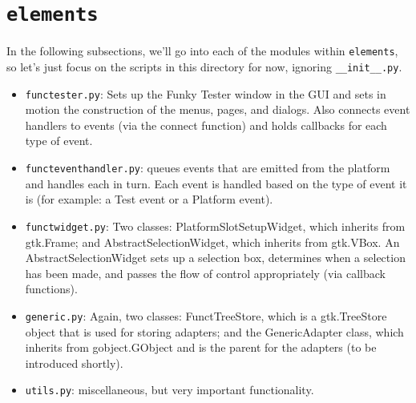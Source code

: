 \documentclass{report}
\begin{document}
\section{\texttt{elements}}
In the following subsections, we'll go into each of the modules within \texttt{elements}, so let's just focus on the scripts in this directory for now, ignoring \texttt{\_\_init\_\_.py}.\\

	\begin{minipage}{\linewidth}
		\label{fig:ui/elements}
	\end{minipage}
		\vspace{5pt}%
		
\begin{itemize}
	\item \texttt{functester.py}: Sets up the Funky Tester window in the GUI and sets in motion the construction of the menus, pages, and dialogs. Also connects event handlers to events (via the connect function) and holds callbacks for each type of event. %
	\item \texttt{functeventhandler.py}: queues events that are emitted from the platform and handles each in turn. Each event is handled based on the type of event it is (for example: a Test event or a Platform event).
	\item \texttt{functwidget.py}: Two classes: PlatformSlotSetupWidget, which inherits from gtk.Frame; and AbstractSelectionWidget, which inherits from gtk.VBox. An AbstractSelectionWidget sets up a selection box, determines when a selection has been made, and passes the flow of control appropriately (via callback functions).
	\item \texttt{generic.py}: Again, two classes: FunctTreeStore, which is a gtk.TreeStore object that is used for storing adapters; and the GenericAdapter class, which inherits from gobject.GObject and is the parent for the adapters (to be introduced shortly).
	\item \texttt{utils.py}: miscellaneous, but very important functionality.
\end{itemize}
\end{document}
